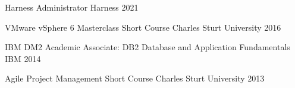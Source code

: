 

\begin{cvhonors}

  \cvhonor
  {Harness Administrator} %
  {Harness} %
  {} %
  {2021} %

  \cvhonor
  {VMware vSphere 6 Masterclass Short Course} %
  {Charles Sturt University} %
  {} %
  {2016} %

  \cvhonor
  {IBM DM2 Academic Associate: DB2 Database and Application Fundamentals} %
  {IBM} %
  {} %
  {2014} %

  \cvhonor
  {Agile Project Management Short Course} %
  {Charles Sturt University} %
  {} %
  {2013} %

\end{cvhonors}

